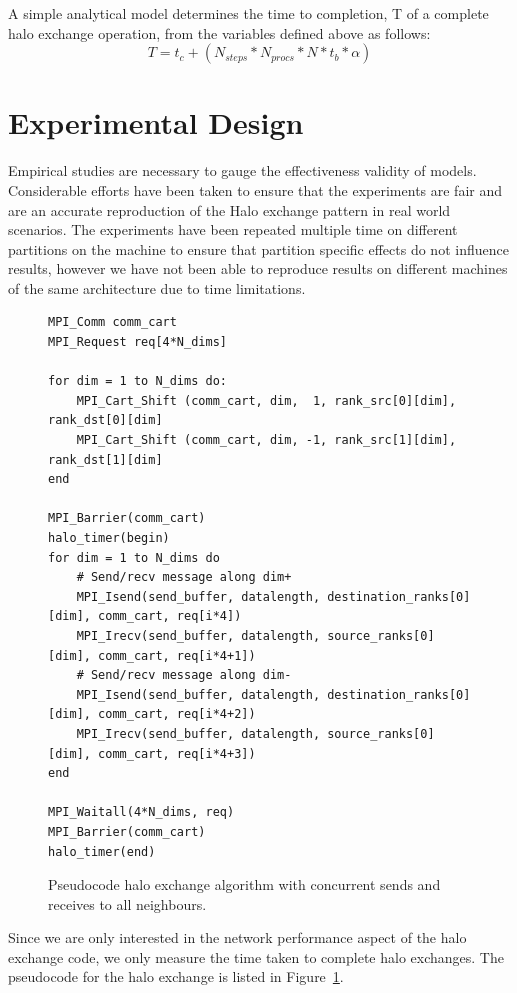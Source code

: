 \documentclass{acm_proc_article-sp}
\begin{document}
A simple analytical model determines the time to completion, T of a complete halo exchange operation,
from the variables defined above as follows:
\begin{equation}
  T = t_c + (N_{steps} * N_{procs} * N * t_b * \alpha)
\end{equation}


\section{Experimental Design}\label{sect:experimental design}

Empirical studies are necessary to gauge the effectiveness validity of models. Considerable efforts have
been taken to ensure that the experiments are fair and are an accurate reproduction of the Halo exchange pattern
in real world scenarios. The experiments have been repeated multiple time on different partitions on the machine
to ensure that partition specific effects do not influence results, however we have not been able to reproduce
results on different machines of the same architecture due to time limitations.

\begin{figure}[ht]
  {\footnotesize
  \begin{lstlisting}[frame=lines, basicstyle=\ttfamily,columns=fixed]
MPI_Comm comm_cart
MPI_Request req[4*N_dims]

for dim = 1 to N_dims do:
    MPI_Cart_Shift (comm_cart, dim,  1, rank_src[0][dim], rank_dst[0][dim]
    MPI_Cart_Shift (comm_cart, dim, -1, rank_src[1][dim], rank_dst[1][dim]
end

MPI_Barrier(comm_cart)
halo_timer(begin)
for dim = 1 to N_dims do
    # Send/recv message along dim+
    MPI_Isend(send_buffer, datalength, destination_ranks[0][dim], comm_cart, req[i*4])
    MPI_Irecv(send_buffer, datalength, source_ranks[0][dim], comm_cart, req[i*4+1])
    # Send/recv message along dim-
    MPI_Isend(send_buffer, datalength, destination_ranks[0][dim], comm_cart, req[i*4+2])
    MPI_Irecv(send_buffer, datalength, source_ranks[0][dim], comm_cart, req[i*4+3])
end

MPI_Waitall(4*N_dims, req)
MPI_Barrier(comm_cart)
halo_timer(end)
  \end{lstlisting}
  }
  \caption{Pseudocode halo exchange algorithm with concurrent sends and
           receives to all neighbours.}
    \label{fig:halo_pseudocode}
\end{figure}

Since we are only interested in the network performance aspect of the halo exchange code, we only measure
the time taken to complete halo exchanges. The pseudocode for the halo exchange is listed in Figure~\ref{fig:halo_pseudocode}.
\end{document}
